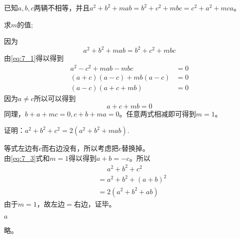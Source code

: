 \documentclass[windows,csize4,answers]{BHCexam}
\begin{document}
\begin{groups}
\begin{questions}[]
        \question[5]  已知$a,b,c$两辆不相等，并且$a^2+b^2+mab=b^2+c^2+mbc=c^2+a^2+mca$。
        \begin{subquestions}
            \subquestion  求$m$的值;
            \begin{solution}{0.5cm}
                \methodonly 因为
                \begin{equation}
                    \label{eq:7_1}
                    a^2+b^2+mab=b^2+c^2+mbc
                \end{equation}
                由\ref{eq:7_1}得以得到
                \begin{equation}
                    \label{eq:7_2}
                    \begin{aligned}
                        a^2-c^2+mab-mbc&=0 \\ 
                        (a+c)(a-c)+mb(a-c)&=0 \\ 
                        (a-c)(a+c+mb)&=0
                    \end{aligned}
                \end{equation}
                因为$a\neq c$所以可以得到
                \begin{equation}
                    \label{eq:7_3}
                    a+c+mb=0   
                \end{equation}
                同理，$b+a+mc=0, c+b+ma=0$。任意两式相减即可得到$m=1$。
            \end{solution}
            \subquestion 证明：$a^2+b^2+c^2=2(a^2+b^2+mab)$.
            \begin{solution}{0.5cm}
                \methodonly 等式左边有$c$而右边没有，所以考虑把$c$替换掉。\\ 
                由\ref{eq:7_3}式和$m=1$得以得到$a+b=-c$。所以
                \begin{equation}
                    \label{eq:7_4}
                    \begin{aligned}
                    &\phantom{=}a^2+b^2+c^2  \\ 
                    &=a^2+b^2+(a+b)^2 \\ 
                    &=2(a^2+b^2+ab)
                    \end{aligned}
                \end{equation}
                由于$m=1$，故左边$=$右边，证毕。
            \end{solution}
        \end{subquestions}
        \vspace{3.5cm}



        \question[5]  $a$
        \begin{solution}{0.5cm}
            \methodonly 略。
        \end{solution}
        \vspace{3.5cm}



    \end{questions}
\end{groups}



\label{lastpage}
\end{document}
